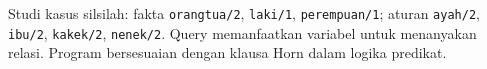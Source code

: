 \begin{konsep}
Studi kasus silsilah: fakta \texttt{orangtua/2}, \texttt{laki/1}, \texttt{perempuan/1}; aturan \texttt{ayah/2}, \texttt{ibu/2}, \texttt{kakek/2}, \texttt{nenek/2}. Query memanfaatkan variabel untuk menanyakan relasi. Program bersesuaian dengan klausa Horn dalam logika predikat.
\end{konsep}
